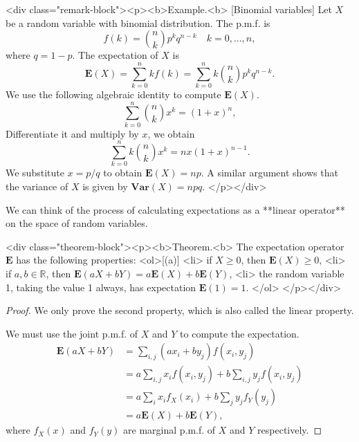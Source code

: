 <div class="remark-block"><p><b>Example.<b> [Binomial variables]
Let $X$ be a random variable with binomial distribution. The p.m.f. is 
$$\begin{equation}
    f(k) = \binom{n}{k} p^k q^{n-k} \quad k = 0,\dots, n,
\end{equation}$$
where $q = 1-p$. The expectation of $X$ is
$$\begin{equation}
    \mathbf{E}(X) = \sum_{k=0}^n k f(k) = \sum_{k=0}^n k\binom{n}{k} p^k q^{n-k}.
\end{equation}$$
We use the following algebraic identity to compute $\mathbf{E}(X)$.
$$$$$$$$\begin{equation}
    \label{eq:4.2}
    \tag{4-2}
    \sum_{k=0}^n \binom{n}{k} x^k = (1+x)^n, 
\end{equation}$$$$$$$$
Differentiate it and multiply by $x$, we obtain 
$$$$$$$$\begin{equation}
    \label{eq:4.3}
    \tag{4-3}
    \sum_{k=0}^n k \binom{n}{k} x^k = nx(1+x)^{n-1}. 
\end{equation}$$$$$$$$
We substitute $x = p / q$ to obtain $\mathbf{E}(X) = np$. A similar argument shows that the variance of $X$ is given by $\mathbf{Var}(X) = npq$. 
</p></div>

We can think of the process of calculating expectations as a **linear operator** on the space of random variables. 

<div class="theorem-block"><p><b>Theorem.<b> 
The expectation operator $\mathbf{E}$ has the following properties: 
<ol>[(a)]
    <li> if $X\geq 0$, then $\mathbf{E}(X) \geq 0$,
    <li> if $a, b \in \mathbb{R}$, then $\mathbf{E}(aX+bY) = a\mathbf{E}(X) + b\mathbf{E}(Y)$,
    <li> the random variable 1, taking the value 1 always, has expectation $\mathbf{E}(1) = 1$. 
</ol>
</p></div>

\begin{proof}
We only prove the second property, which is also called the linear property.

We must use the joint p.m.f. of $X$ and $Y$ to compute the expectation. 
$$\begin{equation}
    \begin{split}
        \mathbf{E}(aX+bY) &= \sum_{i, j} (ax_i + by_j) f(x_i, y_j) \\
        &= a \sum_{i,j} x_i f(x_i, y_j) + b\sum_{i,j} y_j f(x_i, y_j) \\
        &= a\sum_{i} x_i f_X(x_i) + b\sum_{j}y_j f_Y(y_j) \\ 
        &= a\mathbf{E}(X) + b\mathbf{E}(Y),
    \end{split}
\end{equation}$$
where $f_X(x)$ and $f_Y(y)$ are marginal p.m.f. of $X$ and $Y$ respectively.
\end{proof}

